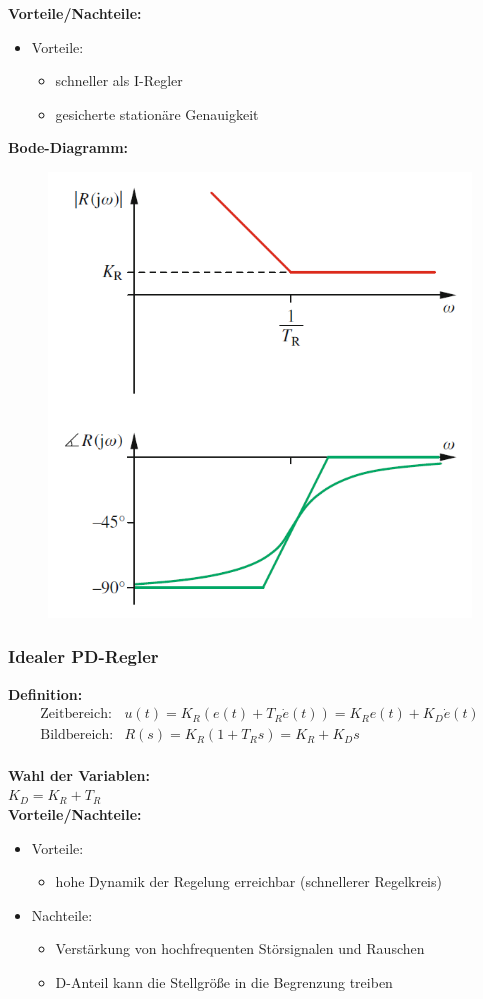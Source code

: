 \documentclass[10pt,a4paper]{article}
\begin{document}
\textbf{Vorteile/Nachteile:}
\begin{itemize}
	\item Vorteile:
	\begin{itemize}
		\item schneller als I-Regler
		\item gesicherte stationäre Genauigkeit
	\end{itemize}
\end{itemize}

\textbf{Bode-Diagramm:}
\begin{figure}[H]
	\includegraphics[width = 0.4\columnwidth]{imgs/pi-regler.png}
\end{figure}


\subsubsection{Idealer PD-Regler}
\textbf{Definition:}
$$
	\begin{array}{ll}
	\text{Zeitbereich:} & u(t) = K_R (e(t) + T_R \dot e(t)) = K_R e(t) + K_D \dot e(t) \\
	\text{Bildbereich:} & R(s) = K_R(1 + T_R s) = K_R + K_D s
	\end{array}
$$ \\

\textbf{Wahl der Variablen:} \\
$K_D = K_R + T_R $  \\

\textbf{Vorteile/Nachteile:}
\begin{itemize}
	\item Vorteile:
	\begin{itemize}
		\item hohe Dynamik der Regelung erreichbar (schnellerer Regelkreis)
	\end{itemize}
	\item Nachteile:
	\begin{itemize}
		\item Verstärkung von hochfrequenten Störsignalen und Rauschen
		\item D-Anteil kann die Stellgröße in die Begrenzung treiben
	\end{itemize}
\end{itemize}
\end{document}
